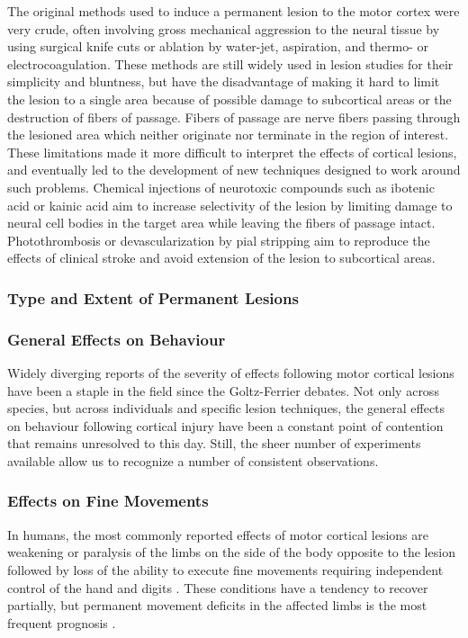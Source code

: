 The original methods used to induce a permanent lesion to the motor cortex were very crude, often involving gross mechanical aggression to the neural tissue by using surgical knife cuts or ablation by water-jet, aspiration, and thermo- or electrocoagulation. These methods are still widely used in lesion studies for their simplicity and bluntness, but have the disadvantage of making it hard to limit the lesion to a single area because of possible damage to subcortical areas or the destruction of fibers of passage. Fibers of passage are nerve fibers passing through the lesioned area which neither originate nor terminate in the region of interest. These limitations made it more difficult to interpret the effects of cortical lesions, and eventually led to the development of new techniques designed to work around such problems. Chemical injections of neurotoxic compounds such as ibotenic acid or kainic acid aim to increase selectivity of the lesion by limiting damage to neural cell bodies in the target area while leaving the fibers of passage intact. Photothrombosis or devascularization by pial stripping aim to reproduce the effects of clinical stroke and avoid extension of the lesion to subcortical areas.

\subsubsection{Type and Extent of Permanent Lesions}

\subsubsection{General Effects on Behaviour}

Widely diverging reports of the severity of effects following motor cortical lesions have been a staple in the field since the Goltz-Ferrier debates. Not only across species, but across individuals and specific lesion techniques, the general effects on behaviour following cortical injury have been a constant point of contention that remains unresolved to this day. Still, the sheer number of experiments available allow us to recognize a number of consistent observations.

\subsubsection{Effects on Fine Movements}

In humans, the most commonly reported effects of motor cortical lesions are weakening or paralysis of the limbs on the side of the body opposite to the lesion followed by loss of the ability to execute fine movements requiring independent control of the hand and digits \cite{Xu2015}. These conditions have a tendency to recover partially, but permanent movement deficits in the affected limbs is the most frequent prognosis \cite{Kwakkel2003}.

